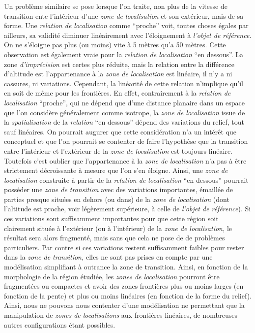 Un problème similaire se pose lorsque l'on traite, non plus de la
vitesse de transition ente l'intérieur d'une \emph{zone de
  localisation} et son extérieur, mais de sa forme. Une \emph{relation
  de localisation} comme \enquote{proche} voit, toutes choses égales
par ailleurs, sa validité diminuer linéairement avec l'éloignement à
\emph{l'objet de référence.} On ne s'éloigne pas plus (ou moins) vite
à 5 mètres qu'a 50 mètres. Cette observation est également vraie pour
la \emph{relation de localisation} \enquote{en dessous}. La zone
\emph{d'imprécision} est certes plus réduite, mais la relation entre
la différence d'altitude est l'appartenance à la \emph{zone de
  localisation} est linéaire, il n'y a ni cassures, ni
variations. Cependant, la linéarité de cette relation n'implique qu'il
en soit de même pour les frontières. En effet, contrairement à la
\emph{relation de localisation} \enquote{proche}, qui ne dépend que
d'une distance planaire dans un espace que l'on considère généralement
comme isotrope, la \emph{zone de localisation} issue de la
\emph{spatialisation} de la \emph{relation} \enquote{en dessous}
dépend des variations du relief, tout sauf linéaires. On pourrait
augurer que cette considération n'a un intérêt que conceptuel et que
l'on pourrait se contenter de faire l'hypothèse que la transition
entre l'intérieur et l'extérieur de la \emph{zone de localisation} est
toujours linéaire. Toutefois c'est oublier que l'appartenance à la
\emph{zone de localisation} n'a pas à être strictement décroissante à
mesure que l'on s'en éloigne. Ainsi, une \emph{zone de localisation}
construite à partir de la \emph{relation de localisation} \enquote{en
  dessous} pourrait posséder une \emph{zone de transition} avec des
variations importantes, émaillée de parties presque situées en dehors
(ou dans) de la \emph{zone de localisation} (\ie dont l'altitude est
proche, voir légèrement supérieure, à celle de \emph{l'objet de
  référence}). Si ces variations sont suffisamment importantes pour
que cette région soit clairement située à l'extérieur (ou à
l'intérieur) de la \emph{zone de localisation,} le résultat sera alors
fragmenté, mais sans que cela ne pose de de problèmes
particuliers. Par contre si ces variations restent suffisamment
faibles pour rester dans la \emph{zone de transition,} elles ne sont
pas prises en compte par une modélisation simplifiant à outrance la
zone de transition. Ainsi, en fonction de la morphologie de la région
étudiée, les \emph{zones de localisation} pourront être fragmentées ou
compactes et avoir des zones frontières plus ou moins larges (en
fonction de la pente) et plus ou moins linéaires (en fonction de la
forme du relief). Ainsi, nous ne pouvons nous contenter d'une
modélisation ne permettant que la manipulation de \emph{zones de
  localisations} aux frontières linéaires, de nombreuses autres
configurations étant possibles.

